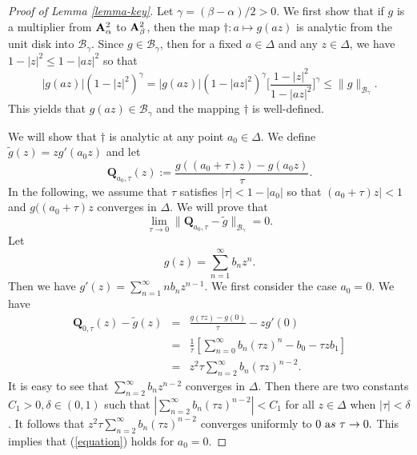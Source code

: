 \documentclass[10pt]{amsart}
\theoremstyle{definition}    %
\numberwithin{equation}{section}
\begin{document}
\begin{proof}[Proof of Lemma \ref{lemma-key}]
Let $\gamma=(\beta-\alpha)/2>0$. We first show that if $g$ is a multiplier from ${\bf A}_{\alpha}^2$ to ${\bf A}_{\beta}^2$, then the map $\dag: a \mapsto g(az)$ is analytic from the unit disk into $\mathcal{B}_{\gamma}$.
Since $g \in \mathcal{B}_{\gamma}$, then for a fixed $a \in \Delta$ and any $z \in \Delta$, we have $1-|z|^2\leq 1-|az|^2$ so that 
$$
|g(az)|(1-|z|^2)^{\gamma} =|g(az)|(1-|az|^2)^{\gamma}\Big[\frac{1-|z|^2}{1-|az|^2}\Big]^{\gamma} \leq \|g\|_{\mathcal{B}_{\gamma}}.
$$
This yields that $g(az) \in \mathcal{B}_\gamma$ and the mapping $\dag$ is well-defined.

We will show that $\dag$ is analytic at any point $a_0 \in \Delta$. We define $\widetilde{g}(z) = z g'(a_0z)$ and let
\begin{equation}\label{lemma-k}
\mathbf{Q}_{a_0, \tau}(z):= \frac{g((a_0+\tau)z) - g(a_0z)}{\tau}.
\end{equation}
In the following, we assume that $\tau$ satisfies $|\tau|<1-|a_0|$ so that $(a_0+\tau)z|<1$ and $g((a_0+\tau)z$ converges in $\Delta$.
We will prove that \begin{equation}\label{equation}
\lim_{\tau \to 0} \|\mathbf{Q}_{a_0,\tau}-\widetilde{g}\|_{\mathcal{B}_\gamma} = 0.\end{equation}
Let $$g(z)=\sum_{n=1}^{\infty}b_nz^n.$$ Then we have $g'(z)=\sum_{n=1}^{\infty}nb_nz^{n-1}$. We first consider the case $a_0=0$. We have
\begin{eqnarray} 
\mathbf{Q}_{0,\tau}(z)-\widetilde{g}(z)&=&\frac{g(\tau z)-g(0)}{\tau}-zg'(0)\nonumber \\
&=&\frac{1}{\tau}[\sum_{n=0}^{\infty}b_n(\tau z)^n-b_0-\tau zb_1]\nonumber \\
&=&z^2\tau\sum_{n=2}^{\infty}b_n(\tau z)^{n-2}.\nonumber
\end{eqnarray}
It is easy to see that $\sum_{n=2}^{\infty}b_n z^{n-2}$
converges in $\Delta$. Then there are two constants $C_1>0, \delta\in (0,1)$ such that $|\sum_{n=2}^{\infty}b_n(\tau z)^{n-2}|<C_1
$ for all $z\in \Delta$ when $|\tau|<\delta$.  It follows that 
$z^2\tau\sum_{n=2}^{\infty}b_n(\tau z)^{n-2}$
converges uniformly to $0\,\, {\text as}\,\, \tau\to 0.$ 
This implies that (\ref{equation}) holds for $a_0=0$. 


\end{proof}
\end{document}

